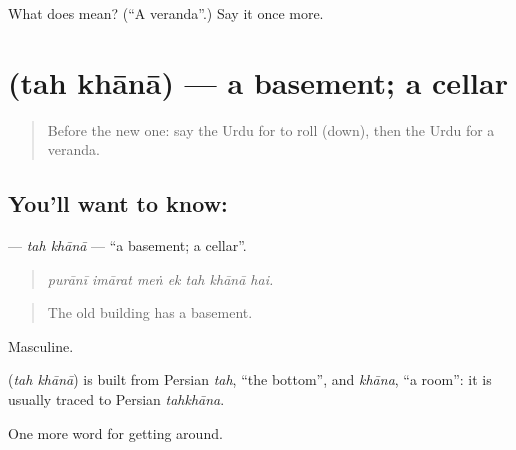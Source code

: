 \begin{tcolorbox}[breakable,colback=teal!4,colframe=teal!35!black,title={Before you move on}]
What does  mean? (\textquotedblleft{}A veranda\textquotedblright{}.) Say it once more.
\end{tcolorbox}
\section[\texorpdfstring{\ur{تہہ} \ur{خانہ} (tah khānā)}{تہہ خانہ (tah khānā)}]{  (tah khānā) — a basement; a cellar}

\label{lesson:UR-C411-tah-khana}



\begin{quote}
Before the new one: say the Urdu for to roll (down), then the Urdu for a veranda.
\end{quote}

\subsection*{You'll want to know:  }
\textbf{ } — \emph{tah khānā} — \textquotedblleft{}a basement; a cellar\textquotedblright{}.

\begin{quote}
      
\end{quote}

\begin{quote}
\emph{purānī imārat meṅ ek tah khānā hai.}
\end{quote}

\begin{quote}
The old building has a basement.
\end{quote}

Masculine.

\begin{cousinweb}
\textbf{ } (\emph{tah khānā}) is built from Persian \emph{tah}, \textquotedblleft{}the bottom\textquotedblright{}, and \emph{khāna}, \textquotedblleft{}a room\textquotedblright{}: it is usually traced to Persian \emph{tahkhāna}.
\end{cousinweb}

\begin{grammarlens}[title={What you've built}]
One more word for getting around.
\end{grammarlens}

